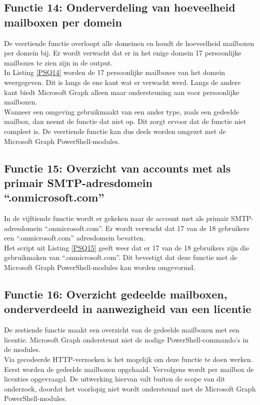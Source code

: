 \subsection{Functie 14: Onderverdeling van hoeveelheid mailboxen per domein}

De veertiende functie overloopt alle domeinen en houdt de hoeveelheid mailboxen per domein bij. Er wordt verwacht dat er in het enige domein 17 persoonlijke mailboxes te zien zijn in de output. \\

In Listing \ref{PSQ14} worden de 17 persoonlijke mailboxes van het domein weergegeven. Dit is langs de ene kant wat er verwacht werd. Langs de andere kant biedt Microsoft Graph alleen maar ondersteuning aan voor persoonlijke mailboxen. \\

Wanneer een omgeving gebruikmaakt van een ander type, zoals een gedeelde mailbox, dan neemt de functie dat niet op. Dit zorgt ervoor dat de functie niet compleet is. De veertiende functie kan dus deels worden omgezet met de Microsoft Graph PowerShell-modules.

\subsection{Functie 15: Overzicht van accounts met als primair SMTP-adresdomein “.onmicrosoft.com”}

In de vijftiende functie wordt er gekeken naar de account met als primair \Ac{SMTP}-adresdomein “.onmicrosoft.com”. Er wordt verwacht dat 17 van de 18 gebruikers een “.onmicrosoft.com” adresdomein bevatten. \\

Het script uit Listing \ref{PSQ15} geeft weer dat er 17 van de 18 gebruikers zijn die gebruikmaken van “.onmicrosoft.com”. Dit bevestigt dat deze functie met de Microsoft Graph PowerShell-modules kan worden omgevormd.

\subsection{Functie 16: Overzicht gedeelde mailboxen, onderverdeeld in aanwezigheid van een licentie}

De zestiende functie maakt een overzicht van de gedeelde mailboxen met een licentie. Microsoft Graph ondersteunt niet de nodige PowerShell-commando's in de modules. \\

Via gecodeerde \ac{HTTP}-verzoeken is het mogelijk om deze functie te doen werken. Eerst worden de gedeelde mailboxen opgehaald. Vervolgens wordt per mailbox de licenties opgevraagd. De uitwerking hiervan valt buiten de scope van dit onderzoek, doordat het voorlopig niet wordt ondersteund met de Microsoft Graph PowerShell-modules.

